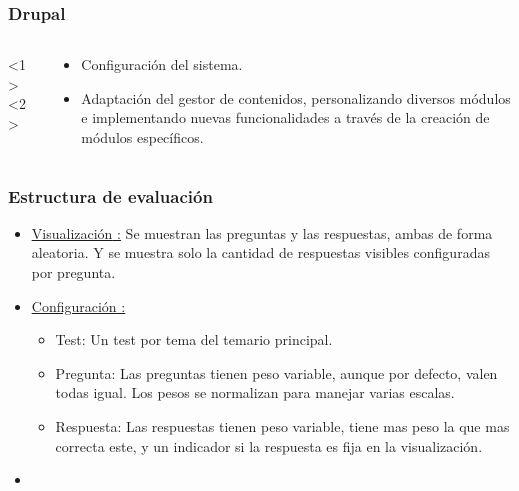 \documentclass{beamer}
\begin{document}
\begin{frame} [label=EVA]
  \frametitle{Drupal}
  
  \begin{columns}
    \begin{column}[l]{4cm}
      <1>
      <2>
    \end{column}
    \begin{column}[l]{5cm}
      \begin{itemize}
        \item <1> Configuración del sistema.
	\item <2> Adaptación del gestor de contenidos, personalizando diversos módulos e implementando nuevas funcionalidades a través de la creación de módulos específicos.
      \end{itemize}

    \end{column}
  \end{columns}
\end{frame}

\begin{frame}
  \frametitle{Estructura de evaluación}
  \begin{itemize}
    \item <1>\underline{\href{http://127.0.0.1/?q=es/node/42}{Visualización} :} Se muestran las preguntas y las respuestas, ambas de forma aleatoria. Y se muestra solo la cantidad de respuestas visibles configuradas por pregunta.
    \item <2>\underline{\href{http://127.0.0.1/?q=es/node/1}{Configuración} :}
    \begin{itemize}
      \item Test: Un test por tema del temario principal.
      \item Pregunta: Las preguntas tienen peso variable, aunque por defecto, valen todas igual. Los pesos se normalizan para manejar varias escalas. 
      \item Respuesta: Las respuestas tienen peso variable, tiene mas peso la que mas correcta este, y un indicador si la respuesta es fija en la visualización.
    \end{itemize}
    \item <2> \hyperlink{OOEVA}{}
  \end{itemize}

\end{frame}
\end{document}
